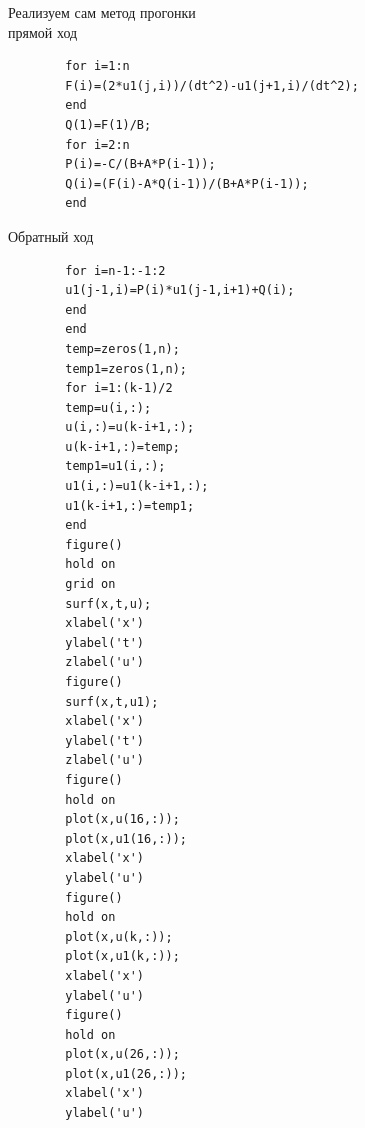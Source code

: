 \documentclass[]{article}
\begin{document}
		 Реализуем сам метод прогонки\\
		 прямой ход\\
	\begin{lstlisting}
		for i=1:n
		F(i)=(2*u1(j,i))/(dt^2)-u1(j+1,i)/(dt^2); 
		end
		Q(1)=F(1)/B;
		for i=2:n
		P(i)=-C/(B+A*P(i-1));
		Q(i)=(F(i)-A*Q(i-1))/(B+A*P(i-1));
		end
	\end{lstlisting}
	Обратный ход
	\begin{lstlisting}
		for i=n-1:-1:2
		u1(j-1,i)=P(i)*u1(j-1,i+1)+Q(i); 
		end
		end
		temp=zeros(1,n);
		temp1=zeros(1,n);
		for i=1:(k-1)/2
		temp=u(i,:);
		u(i,:)=u(k-i+1,:);
		u(k-i+1,:)=temp;
		temp1=u1(i,:);
		u1(i,:)=u1(k-i+1,:);
		u1(k-i+1,:)=temp1;
		end
		figure()
		hold on
		grid on
		surf(x,t,u);
		xlabel('x')
		ylabel('t')
		zlabel('u')
		figure()
		surf(x,t,u1);
		xlabel('x')
		ylabel('t')
		zlabel('u')
		figure()
		hold on
		plot(x,u(16,:));
		plot(x,u1(16,:));
		xlabel('x')
		ylabel('u')
		figure()
		hold on
		plot(x,u(k,:));
		plot(x,u1(k,:));
		xlabel('x')
		ylabel('u')
		figure()
		hold on
		plot(x,u(26,:));
		plot(x,u1(26,:));
		xlabel('x')
		ylabel('u')
	\end{lstlisting}
\end{document}
